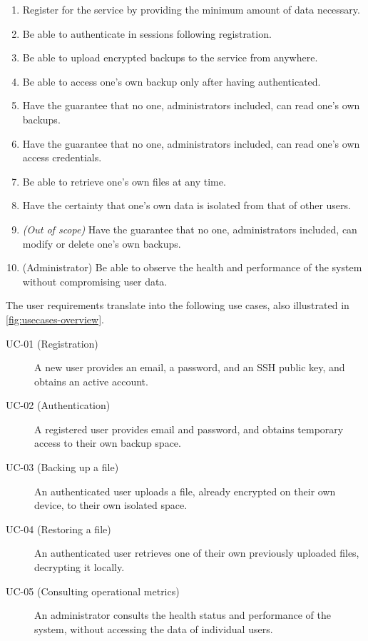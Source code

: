 \begin{enumerate}
    \item[RU-01] Register for the service by providing the minimum amount of data necessary.
    \item[RU-02] Be able to authenticate in sessions following registration.
    \item[RU-03] Be able to upload encrypted backups to the service from anywhere.
    \item[RU-04] Be able to access one's own backup only after having authenticated.
    \item[RU-05] Have the guarantee that no one, administrators included, can read one's own backups.
    \item[RU-06] Have the guarantee that no one, administrators included, can read one's own
    access credentials.
    \item[RU-07] Be able to retrieve one's own files at any time.
    \item[RU-08] Have the certainty that one's own data is isolated from that of other users.
    \item[RU-09] \textit{(Out of scope)} Have the guarantee that no one, administrators included, can
    modify or delete one's own backups.
    \item[RU-10] (Administrator) Be able to observe the health and performance of the system without
    compromising user data.
\end{enumerate}


\newpage

The user requirements translate into the following use cases, also illustrated in \autoref{fig:usecases-overview}.

\begin{description}
    \item[UC-01 (Registration)] A new user provides an email, a password, and an SSH public key, and
    obtains an active account.
    \item[UC-02 (Authentication)] A registered user provides email and password, and obtains temporary
    access to their own backup space.
    \item[UC-03 (Backing up a file)] An authenticated user uploads a file, already encrypted on their own
    device, to their own isolated space.
    \item[UC-04 (Restoring a file)] An authenticated user retrieves one of their own previously
    uploaded files, decrypting it locally.
    \item[UC-05 (Consulting operational metrics)] An administrator consults the health status
    and performance of the system, without accessing the data of individual users.
\end{description}

